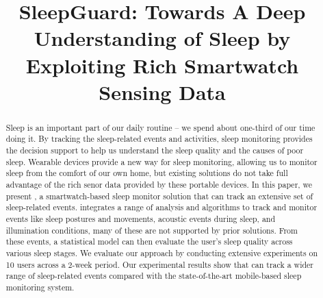 \documentclass[conference]{sigchi}
\begin{document}
\title{SleepGuard: Towards A Deep Understanding of Sleep by Exploiting Rich Smartwatch Sensing Data}

\maketitle

\begin{abstract}

Sleep is an important part of our daily routine -- we spend about one-third of our time doing it. By tracking the
sleep-related events and activities, sleep monitoring provides the decision
support to help us understand the sleep quality and the causes of poor sleep. Wearable
devices provide a new way for sleep monitoring, allowing us to monitor sleep from
the comfort of our own home, but existing solutions do not take full advantage
of the rich senor data provided by these portable devices. In this paper, we present {\systemname}, a
smartwatch-based sleep monitor solution that can track an extensive set of
sleep-related events. \systemname integrates a range of analysis and algorithms
to track and monitor events like sleep postures and movements, acoustic events during sleep, and illumination conditions,
many of these are not supported by prior solutions. From these events, a statistical
model can then evaluate the user's sleep quality across various sleep stages.
We evaluate our approach by conducting extensive experiments on 10 users across
a 2-week period. Our experimental results show that \systemname can track a
wider range of sleep-related events compared with the state-of-the-art mobile-based
sleep monitoring system.
\end{abstract}
\end{document}
